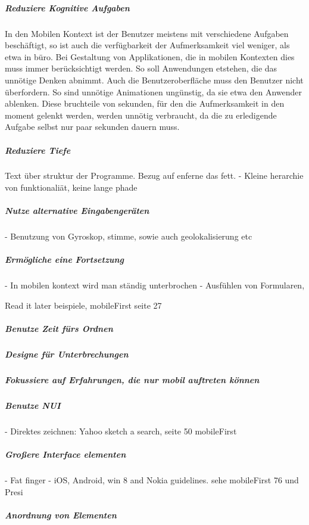 \subparagraph{Reduziere Kognitive Aufgaben } 
\label{subp:reduziere_kognitive_aufgaben_}

In den Mobilen Kontext ist der Benutzer meistens mit verschiedene Aufgaben beschäftigt, so ist auch die verfügbarkeit der Aufmerksamkeit viel weniger, als etwa in büro. Bei Gestaltung von Applikationen, die in mobilen Kontexten dies muss immer berücksichtigt werden. So soll Anwendungen etstehen, die das unnötige Denken abnimmt. Auch die Benutzeroberfläche muss den Benutzer nicht überfordern. So sind unnötige Animationen ungünstig, da sie etwa den Anwender ablenken. Diese bruchteile von sekunden, für den die Aufmerksamkeit in den moment gelenkt werden, werden unnötig verbraucht, da die zu erledigende Aufgabe selbst nur paar sekunden dauern muss.


\subparagraph{Reduziere Tiefe} 
\label{subp:reduziere_das_w_hlen}


Text über struktur der Programme. Bezug auf enferne das fett.
- Kleine herarchie von funktionaliät, keine lange phade

\subparagraph{Nutze alternative Eingabengeräten}
\label{subp:nutze_alternative_eingabenger_ten}

- Benutzung von Gyroskop, stimme, sowie auch geolokalisierung etc


\subparagraph{Ermögliche eine Fortsetzung}
\label{subp:erm_gliche_eine_fortsetzung}

- In mobilen kontext wird man ständig unterbrochen
- Ausfühlen von Formularen, 

Read it later beispiele, mobileFirst seite 27

\subparagraph{Benutze Zeit fürs Ordnen}
\label{subp:benutze_zeit_als_ordnungsprinzip}


\subparagraph{Designe für Unterbrechungen} %
\label{subp:designe_f_r_unterbrechungen}


\subparagraph{Fokussiere auf Erfahrungen, die nur mobil auftreten können} %
\label{subp:fokussiere_auf_erfahrungen_die_nur_mobil_auftreten_k_nnen}


\subparagraph{Benutze NUI} 
\label{subp:benutze_nui}

- Direktes zeichnen: Yahoo sketch a search, seite 50 mobileFirst


\subparagraph{Großere Interface elementen} 
\label{subp:gro_ere_interface_elementen}

- Fat finger
- iOS, Android, win 8 and Nokia guidelines. sehe mobileFirst 76 und Presi

\subparagraph{Anordnung von Elementen} 
\label{subp:anordnung_von_elementen}

